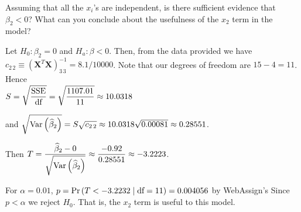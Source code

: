 Assuming that all the $x_i$'s are independent, is there sufficient evidence that $\beta_2 < 0$? What can you conclude about the usefulness of the $x_2$ term in the model?

\soln Let $H_0 : \beta_2 = 0$ and $H_a : \beta  < 0$. Then, from the data provided we have $c_{2\,2} \equiv (\mathbf X^T \mathbf X)^{-1}_{3\,3} = 8.1 / 10000$. Note that our degrees of freedom are $15-4 = 11$. Hence\\ $S = \displaystyle \sqrt{\frac{\operatorname{SSE}}{\text{df}}} = \sqrt{\frac{1107.01}{11}} \approx 10.0318$

\nl and $\sqrt{\Var{\betah_2}} = S\sqrt{c_{2\,2}} \approx 10.0318 \sqrt{0.00081} \approx 0.28551$.

\nl Then $\displaystyle T = \dfrac{\betah_2 - 0}{\sqrt{\Var{\betah_2}}} \approx \dfrac{-0.92}{0.28551} \approx -3.2223$.

\nl For $\alpha = 0.01$, $p = \P{T < -3.2232 \mid \df = 11} = 0.004056$ by WebAssign's  Since $p < \alpha$ we reject $H_0$. That is, the $x_2$ term is useful to this model.